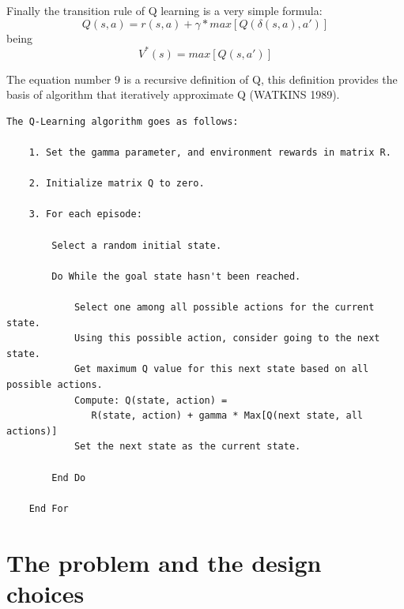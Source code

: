 \documentclass[a4paper]{article}
\begin{document}
Finally the transition rule of Q learning is a very simple formula:
\begin{equation}
Q(s, a)=r(s, a)+ \gamma*max[Q(\delta(s,a), a')]
\end{equation}
being
\begin{equation}
V^{*}(s)=max[Q(s, a')]
\end{equation}

The equation number 9 is a recursive definition of Q, this definition provides the basis of algorithm that iteratively approximate Q (WATKINS 1989).
\begin{verbatim}
The Q-Learning algorithm goes as follows:

    1. Set the gamma parameter, and environment rewards in matrix R.

    2. Initialize matrix Q to zero.

    3. For each episode:

        Select a random initial state.

        Do While the goal state hasn't been reached.

            Select one among all possible actions for the current state.
            Using this possible action, consider going to the next state.
            Get maximum Q value for this next state based on all possible actions.
            Compute: Q(state, action) = 
               R(state, action) + gamma * Max[Q(next state, all actions)]
            Set the next state as the current state.

        End Do

    End For
\end{verbatim}
\newpage
\section{The problem and the design choices}
\end{document}
